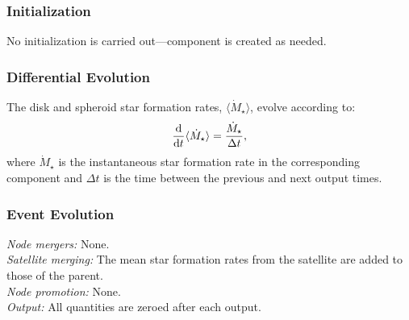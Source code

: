 \subsubsection{Initialization}

No initialization is carried out---component is created as needed.

\subsubsection{Differential Evolution}

The disk and spheroid star formation rates, $\langle \dot{M}_\star \rangle$, evolve according to:
\begin{equation}
{{\rm d} \over {\rm d} t} \langle \dot{M}_\star \rangle = {\dot{M}_\star \over \Delta t},
\end{equation}
where $\dot{M}_\star$ is the instantaneous star formation rate in the corresponding component and $\Delta t$ is the time between the previous and next output times.

\subsubsection{Event Evolution}

\noindent\emph{Node mergers:} None.\\

\noindent\emph{Satellite merging:} The mean star formation rates from the satellite are added to those of the parent.\\

\noindent\emph{Node promotion:} None.\\

\noindent\emph{Output:} All quantities are zeroed after each output.\\


